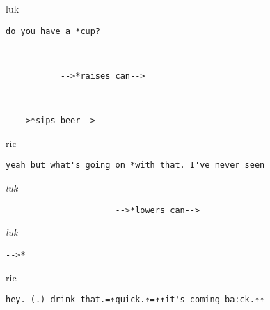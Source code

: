 \documentclass[output=paper,nonflat,modfont,draft]{langsci/langscibook}
\begin{document}
\begin{transbox}{11}{luk}
\begin{verbatim}
do you have a *cup?
\end{verbatim}
\end{transbox}

\begin{transbox}{12}{~}
\begin{verbatim}
           -->*raises can-->
\end{verbatim}
\end{transbox}


\begin{transbox}{14}{~}
\begin{verbatim}
  -->*sips beer-->
\end{verbatim}
\end{transbox}

\begin{transbox}{15}{ric}
\begin{verbatim}
yeah but what's going on *with that. I've never seen
\end{verbatim}
\end{transbox}

\begin{transbox}{16}{\textit{luk}}
\begin{verbatim}
                      -->*lowers can-->
\end{verbatim}
\end{transbox}



\begin{transbox}{19}{\textit{luk}}
\begin{verbatim}
-->*
\end{verbatim}
\end{transbox}

\begin{mdframedkendrick}[style=firstfoc]
\begin{transbox}{20}{ric}
\begin{verbatim}
hey. (.) drink that.=↑quick.↑=↑↑it's coming ba:ck.↑↑
\end{verbatim}
\end{transbox}
\end{mdframedkendrick}\vspace{-5mm}

\end{document}
